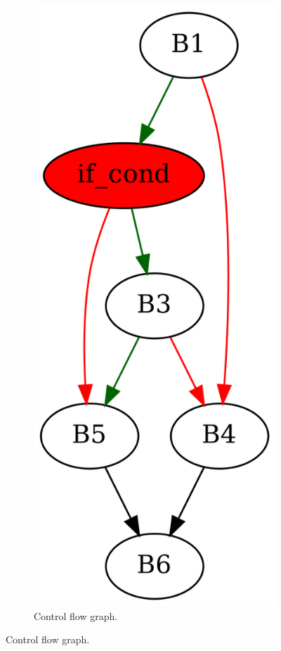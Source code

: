 \documentclass[aspectratio=1610]{beamer}
\begin{document}
\begin{frame}[noframenumbering]
\begin{figure}[htbp]
\begin{subfigure}[b]{0.50\textwidth}
			\includegraphics[height=0.5\paperheight]{inc/methods/interval/counter-example/bool_propagation_jump/f_0001b.png}
			\caption{Control flow graph.}
		\end{subfigure}
	\end{figure}
\end{frame}
\end{document}
